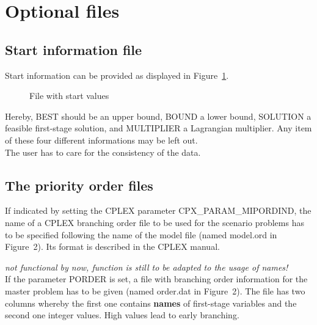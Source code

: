 \documentclass[11pt,draft]{article}
\newcommand{\+}{{\ti{+}}}
\newcommand{\1}{{\ti{1}}}
\begin{document}
\section{Optional files}
\subsection{Start information file} \label{S:START}
Start information can be provided as displayed in Figure~\ref{F:START}.
%
\begin{figure}[ht]
\begin{center}
\end{center} \caption{File with start values} \label{F:START}
\end{figure}
%
Hereby, BEST should be an upper bound, BOUND a lower bound, SOLUTION a feasible first-stage
solution, and MULTIPLIER a Lagrangian multiplier. Any item of these four different informations may be
left out.\\
The user has to care for the consistency of the data. 

\subsection{The priority order files} \label{S:ORDER}
If indicated by setting the CPLEX parameter CPX\_PARAM\_MIPORDIND, the name of a CPLEX branching order file to be used for the scenario
problems has to be specified following the name of the model file (named model.ord in Figure~2). Its format is described in the CPLEX manual.

{\it not functional by now, function is still to be adapted to the usage of names!}\\
If the parameter PORDER is set, a file with branching order information for the master problem has to be given (named order.dat in Figure~2).
The file has two columns whereby the first one contains {\bf names} of first-stage variables and
the second one integer values. High values lead to early branching. 
\end{document}
